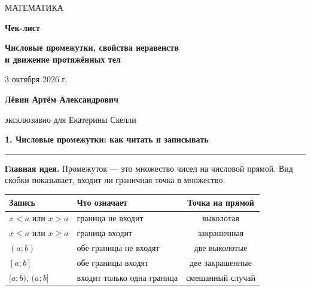 \documentclass[a4paper,12pt]{article}
\newcommand{\sectiontitle}[1]{%
  \vspace{2mm}%
  {\Large\bfseries\color{darkaccent}#1}\par\vspace{1mm}%
  {\color{linegray}\hrule}\vspace{2mm}%
}
\newcommand{\key}[1]{\textbf{\color{darkaccent}#1}}
\begin{document}
\thispagestyle{empty}
\begin{center}
\vspace*{25mm}
{\small\color{softgray}МАТЕМАТИКА}\par
\vspace{8mm}
{\Huge\bfseries\color{darkaccent}Чек-лист}\par
\vspace{5mm}
{\LARGE\bfseries Числовые промежутки, свойства неравенств\\[2mm]
и движение протяжённых тел}\par
\vspace{12mm}
{\large 3 октября 2026 г.}\par
\vfill
{\large\bfseries Лёвин Артём Александрович}\par
\vspace{2mm}
{\large эксклюзивно для Екатерины Скелли}\par
\vspace{20mm}
\end{center}
\clearpage

\sectiontitle{1. Числовые промежутки: как читать и записывать}

\key{Главная идея.} Промежуток --- это множество чисел на числовой прямой. Вид скобки показывает, входит ли граничная точка в множество.

\begin{center}
\renewcommand{\arraystretch}{1.35}
\begin{tabularx}{0.92\linewidth}{@{}lXc@{}}
\toprule
Запись & Что означает & Точка на прямой \\
\midrule
$x<a$ или $x>a$ & граница не входит & выколотая \\
$x\le a$ или $x\ge a$ & граница входит & закрашенная \\
$(a;b)$ & обе границы не входят & две выколотые \\
$[a;b]$ & обе границы входят & две закрашенные \\
$[a;b)$, $(a;b]$ & входит только одна граница & смешанный случай \\
\bottomrule
\end{tabularx}
\end{center}
\end{document}
